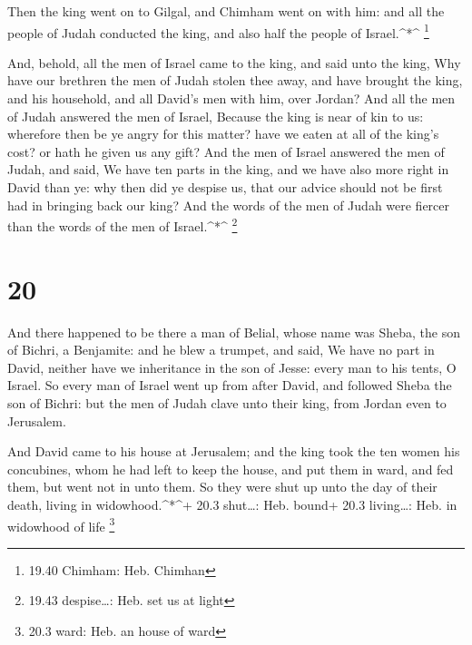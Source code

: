  Then the king went on to Gilgal, and Chimham went on with
him: and all the people of Judah conducted the king, and also half the
people of Israel.\^{}*\^{} \footnote{19.40 Chimham: Heb. Chimhan}

 And, behold, all the men of Israel came to the king, and
said unto the king, Why have our brethren the men of Judah stolen thee
away, and have brought the king, and his household, and all David's men
with him, over Jordan?  And all the men of Judah answered
the men of Israel, Because the king is near of kin to us: wherefore then
be ye angry for this matter? have we eaten at all of the king's cost? or
hath he given us any gift?  And the men of Israel answered
the men of Judah, and said, We have ten parts in the king, and we have
also more right in David than ye: why then did ye despise us, that our
advice should not be first had in bringing back our king? And the words
of the men of Judah were fiercer than the words of the men of
Israel.\^{}*\^{} \footnote{19.43 despise\ldots: Heb. set us at light}

\hypertarget{section-19}{%
\section{20}\label{section-19}}

 And there happened to be there a man of Belial, whose name
was Sheba, the son of Bichri, a Benjamite: and he blew a trumpet, and
said, We have no part in David, neither have we inheritance in the son
of Jesse: every man to his tents, O Israel.  So every man of
Israel went up from after David, and followed Sheba the son of Bichri:
but the men of Judah clave unto their king, from Jordan even to
Jerusalem.

 And David came to his house at Jerusalem; and the king took
the ten women his concubines, whom he had left to keep the house, and
put them in ward, and fed them, but went not in unto them. So they were
shut up unto the day of their death, living in widowhood.\^{}*\^{}+ 20.3
shut\ldots: Heb. bound+ 20.3 living\ldots: Heb. in widowhood of life
\footnote{20.3 ward: Heb. an house of ward}

